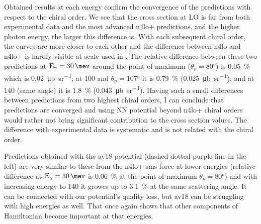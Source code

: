     Obtained results at each energy confirm the convergence 
    of the predictions with respect to the chiral order.
    We see that the cross section at LO is far from both experimental 
    data and the most advanced \gls{n4lo+} predictions, and
    the higher photon energy, the larger this
    difference is. With each subsequent chiral order, the 
    curves are more closer to each other and the difference
    between \gls{n4lo} and \gls{n4lo+} is hardly visible at scale used in .
    The relative difference between these two predictions at $\text{E}_\gamma=\SI{30}{\mev}$ around the point of maximum 
    ($\theta_p = \ang{80}$) is \SI{0.05}{\percent} which is \SI{0.02}{\micro \barn \per \steradian};
    at \SI{100}{\mev} and $\theta_p = \ang{107}$ it is \SI{0.79}{\percent} (\SI{0.025}{\micro \barn \per \steradian});
    and at \SI{140}{\mev} (same angle) it is \SI{1.8}{\percent} (\SI{0.043}{\micro \barn \per \steradian}).
    Having such a small differences between predictions from two highest chiral orders,
    I can conclude that predictions are converged and 
    using NN potential beyond \gls{n4lo+} chiral orders would rather not bring significant contribution 
    to the cross section values. 
    The difference with experimental data is systematic 
    and is not related with the chiral order. 
    

    Predictions obtained with the \gls{av18} potential 
    (dashed-dotted purple line in the  left)
    are very similar to these from the \gls{n4lo+} \gls{sms} force at lower energies
    (relative difference at $\text{E}_\gamma=\SI{30}{\mev}$ is \SI{0.06}{\percent}
    at the point of maximum $\theta_p = \ang{80}$) and with increasing energy to \SI{140}{\mev}
    it growes up to \SI{3.1}{\percent} at the same scattering angle. 
    It can be connected with our potential's quality loss, but \gls{av18} can
    be struggling with high energies as well.
    That once again shows that other 
    components of Hamiltonian become important at that energies.

